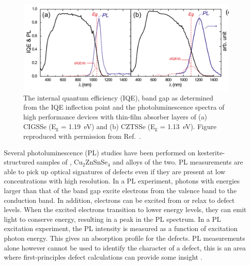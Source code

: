 \documentclass[11pt, twoside]{report}
\begin{document}
\begin{figure}[h!]
  \centering
    \includegraphics[width=1.0\textwidth]{figures/CZTS+CIGS_PL.png}
    \caption[The internal quantum efficiency (IQE), band gap as determined from the IQE inflection point and the photoluminescence spectra of high performance devices with thin-film absorber layers of (a) CIGSSe (E$_\mathrm{g}$ = \SI{1.19}{eV}) and (b) CZTSSe (E$_\mathrm{g}$ = \SI{1.13}{eV}).]{The internal quantum efficiency (IQE), band gap as determined from the IQE inflection point and the photoluminescence spectra of high performance devices with thin-film absorber layers of (a) CIGSSe (E$_\mathrm{g}$ = \SI{1.19}{eV}) and (b) CZTSSe (E$_\mathrm{g}$ = \SI{1.13}{eV}). Figure reproduced with permission from Ref.~.}
  \label{CZTS+CIGS_PL}
\end{figure}

Several photoluminescence (PL) studies have been performed on kesterite-structured samples of {\CZTS}, Cu$_2$ZnSnSe$_4$ and alloys of the two. 
PL measurements are able to pick up optical signatures of defects even if they are present at low concentrations with high resolution. 
In a PL experiment, photons with energies larger than that of the band gap excite electrons from the valence band to the conduction band. In addition, electrons can be excited from or relax to defect levels. When the excited electrons transition to lower energy levels, they can emit light to conserve energy, resulting in a peak in the PL spectrum. In a PL excitation experiment, the PL intensity is measured as a function of excitation photon energy. This gives an absorption profile for the defects.
PL measurements alone however cannot be used to identify the character of a defect, this is an area where first-principles defect calculations can provide some insight \cite{defects_tutorial}.
\end{document}
